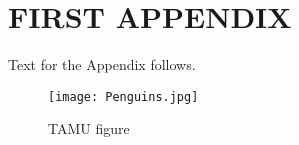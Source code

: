 %
%
%
%	 
%



\chapter{\uppercase{First Appendix}}

Text for the Appendix follows.

\begin{figure}[h]
\centering
\texttt{[image: Penguins.jpg]}
\caption{TAMU figure}
\label{fig:tamu-fig5}
\end{figure}
